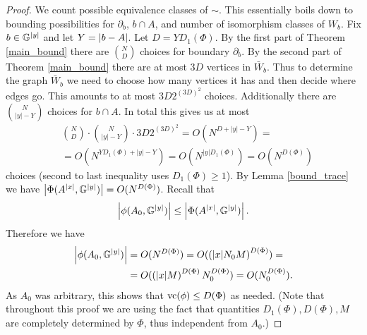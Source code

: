 \documentclass{amsart}
\begin{document}
\begin{proof}
  We count possible equivalence classes of $\sim$.
  This essentially boils down to bounding possibilities for $\partial_b$, $b \cap A$, and number of isomorphism classes of $W_b$.
  Fix $b \in \mathbb G^{|y|}$ and let $Y = \left|b - A\right|$.
  Let $D = Y D_1(\Phi)$.
  By the first part of Theorem \ref{main_bound} there are $N \choose D$ choices for boundary $\partial_b$.
  By the second part of Theorem \ref{main_bound} there are at most $3D$ vertices in $\bar W_b$.
  Thus to determine the graph $\bar W_b$ we need to choose how many vertices it has and then decide where edges go.
  This amounts to at most $3D 2^{(3D)^2}$ choices.
  Additionally there are $N \choose |y| - Y$ choices for $b \cap A$.
  In total this gives us at most
  \begin{align*}
    &{N \choose D} \cdot {N \choose |y| - Y} \cdot 3D 2^{(3D)^2} = O(N^{D + |y| - Y}) = \\
    &= O(N^{Y D_1(\Phi) + |y| - Y}) = O(N^{|y| D_1(\Phi)}) = O(N^{D(\Phi)})
  \end{align*}
  choices (second to last inequality uses $D_1(\Phi) \geq 1$).
  By Lemma \ref{bound_trace} we have $\left|\Phi(A^{|x|}, \mathbb G^{|y|})\right| = O(N^{D(\Phi)})$.
  Recall that 
  \begin{align*}
    \left|\phi(A_0, \mathbb G^{|y|})\right| \leq \left|\Phi(A^{|x|}, \mathbb G^{|y|})\right|.    
  \end{align*}
  Therefore we have
  \begin{align*}
    \left|\phi(A_0, \mathbb G^{|y|})\right| &= O(N^{D(\Phi)}) = O(\left(|x| N_0 M\right)^{D(\Phi)}) = \\
    &= O(\left(|x| M\right)^{D(\Phi)} N_0^{D(\Phi)}) = O(N_0^{D(\Phi)}).
  \end{align*}
  As $A_0$ was arbitrary, this shows that $\operatorname{vc}(\phi) \leq D(\Phi)$ as needed.
  (Note that throughout this proof we are using the fact that quantities $D_1(\Phi), D(\Phi), M$ are completely determined by $\Phi$,
  thus independent from $A_0$.)
\end{proof}
\end{document}
